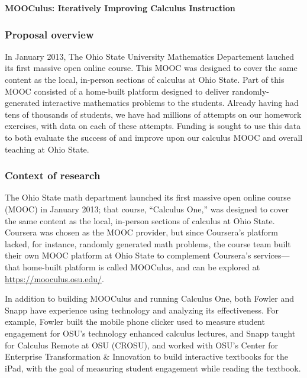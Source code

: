 \documentclass[12pt]{article}
\begin{document}
\begin{center}
  \textbf{MOOCulus: Iteratively Improving Calculus Instruction}
\end{center}

\subsubsection*{Proposal overview}

In January 2013, The Ohio State University Mathematics Departement
lauched its first massive open online course. This MOOC was designed
to cover the same content as the local, in-person sections of calculus
at Ohio State. Part of this MOOC consisted of a home-built platform
designed to deliver randomly-generated interactive mathematics
problems to the students. Already having had tens of thousands of
students, we have had millions of attempts on our homework exercises,
with data on each of these attempts.  Funding is sought to use this
data to both evaluate the success of and improve upon our calculus
MOOC and overall teaching at Ohio State.


\subsubsection*{Context of research}

The Ohio State math department launched its first massive open online
course (MOOC) in January 2013; that course, ``Calculus One,'' was
designed to cover the same content as the local, in-person sections of
calculus at Ohio State.  Coursera was chosen as the MOOC provider, but
since Coursera's platform lacked, for instance, randomly generated
math problems, the course team built their own MOOC platform at Ohio
State to complement Coursera's services---that home-built platform is
called MOOCulus, and can be explored at
\url{https://mooculus.osu.edu/}.

In addition to building MOOCulus and running Calculus One, both Fowler
and Snapp have experience using technology and analyzing its
effectiveness.  For example, Fowler built the mobile phone clicker
used to measure student engagement for OSU's technology enhanced
calculus lectures, and Snapp taught for Calculus Remote at OSU
(CROSU), and worked with OSU's Center for Enterprise Transformation \&
Innovation to build interactive textbooks for the iPad, with the goal
of measuring student engagement while reading the textbook.
\end{document}
